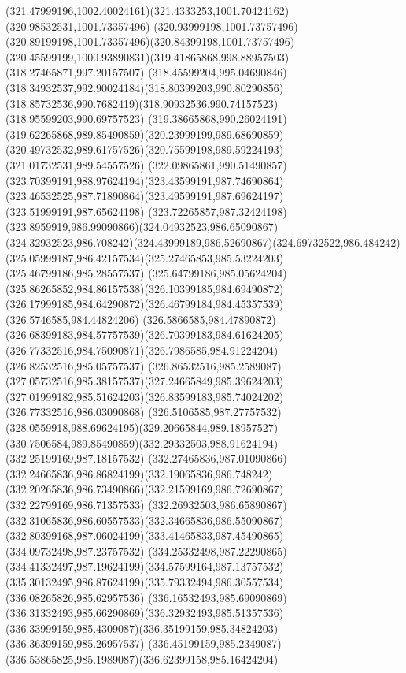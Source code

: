 {{		\curveto(321.47999196,1002.40024161)(321.4333253,1001.70424162)(320.98532531,1001.73357496)
		\curveto(320.93999198,1001.73757496)(320.89199198,1001.73357496)(320.84399198,1001.73757496)
		\curveto(320.45599199,1000.93890831)(319.41865868,998.88957503)(318.27465871,997.20157507)
		\curveto(318.45599204,995.04690846)(318.34932537,992.90024184)(318.80399203,990.80290856)
		\curveto(318.85732536,990.7682419)(318.90932536,990.74157523)(318.95599203,990.69757523)
		\curveto(319.38665868,990.26024191)(319.62265868,989.85490859)(320.23999199,989.68690859)
		\curveto(320.49732532,989.61757526)(320.75599198,989.59224193)(321.01732531,989.54557526)
		\curveto(322.09865861,990.51490857)(323.70399191,988.97624194)(323.43599191,987.74690864)
		\curveto(323.46532525,987.71890864)(323.49599191,987.69624197)(323.51999191,987.65624198)
		\curveto(323.72265857,987.32424198)(323.8959919,986.99090866)(324.04932523,986.65090867)
		\curveto(324.32932523,986.708242)(324.43999189,986.52690867)(324.69732522,986.484242)
		\curveto(325.05999187,986.42157534)(325.27465853,985.53224203)(325.46799186,985.28557537)
		\curveto(325.64799186,985.05624204)(325.86265852,984.86157538)(326.10399185,984.69490872)
		\curveto(326.17999185,984.64290872)(326.46799184,984.45357539)(326.5746585,984.44824206)
		\curveto(326.5866585,984.47890872)(326.68399183,984.57757539)(326.70399183,984.61624205)
		\curveto(326.77332516,984.75090871)(326.7986585,984.91224204)(326.82532516,985.05757537)
		\curveto(326.86532516,985.2589087)(327.05732516,985.38157537)(327.24665849,985.39624203)
		\curveto(327.01999182,985.51624203)(326.83599183,985.74024202)(326.77332516,986.03090868)
		\curveto(326.5106585,987.27757532)(328.0559918,988.69624195)(329.20665844,989.18957527)
		\curveto(330.7506584,989.85490859)(332.29332503,988.91624194)(332.25199169,987.18157532)
		\curveto(332.27465836,987.01090866)(332.24665836,986.86824199)(332.19065836,986.748242)
		\curveto(332.20265836,986.73490866)(332.21599169,986.72690867)(332.22799169,986.71357533)
		\curveto(332.26932503,986.65890867)(332.31065836,986.60557533)(332.34665836,986.55090867)
		\curveto(332.80399168,987.06024199)(333.41465833,987.45490865)(334.09732498,987.23757532)
		\curveto(334.25332498,987.22290865)(334.41332497,987.19624199)(334.57599164,987.13757532)
		\curveto(335.30132495,986.87624199)(335.79332494,986.30557534)(336.08265826,985.62957536)
		\curveto(336.16532493,985.69090869)(336.31332493,985.66290869)(336.32932493,985.51357536)
		\curveto(336.33999159,985.4309087)(336.35199159,985.34824203)(336.36399159,985.26957537)
		\curveto(336.45199159,985.2349087)(336.53865825,985.1989087)(336.62399158,985.16424204)
}}
